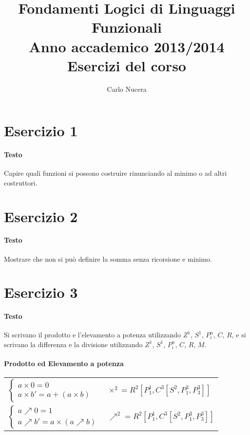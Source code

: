 \documentclass[a4paper,10pt]{article}
\begin{document}
\title{Fondamenti Logici di Linguaggi Funzionali \\ \small{Anno accademico 2013/2014 \\ Esercizi del corso}}
\author{Carlo Nucera}

\maketitle

\section*{Esercizio 1}
\paragraph{Testo}
Capire quali funzioni si possono costruire rinunciando al minimo o ad altri costruttori.

\section*{Esercizio 2}
\paragraph{Testo}
Mostrare che non si può definire la somma senza ricorsione e minimo.

\section*{Esercizio 3}
\paragraph{Testo}
Si scrivano il prodotto e l’elevamento a potenza utilizzando $Z^1$, $S^1$, $P^n_i$, $C$, $R$, e si scrivano la differenza e la divisione utilizzando $Z^1$, $S^1$, $P^n_i$, $C$, $R$, $M$.
\paragraph{Prodotto ed Elevamento a potenza}
\begin{center}
\begin{tabular}{p{5 cm} p{5 cm}}
  $\begin{cases} a \times 0 = 0 \\a \times b' = a + (a \times b) \end{cases}$& $\times^2 = R^2[P^1_1,C^3[S^2,P^3_1,P^3_3]]$
  \\
  $\begin{cases} a \nearrow 0 = 1 \\ a \nearrow b' = a \times (a \nearrow b) \end{cases}$& $\nearrow^2 = R^2[P^1_1,C^3[S^2,P^3_1,P^3_3]]$
\end{tabular}
\end{center}
\end{document}
